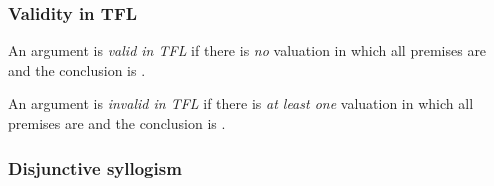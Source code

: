 \begin{frame}
  \frametitle{Validity in TFL}

  \begin{definition}
  An argument is \emph{valid in TFL} if there is \emph{no} valuation in which
  all premises are \True{} and the conclusion is \False.

  An argument is \emph{invalid in TFL} if there is \emph{at least one}
  valuation in which all premises are \True{} and the conclusion is
  \False.
  \end{definition}
\end{frame}

\begin{frame}
  \frametitle{Disjunctive syllogism}



\end{frame}
